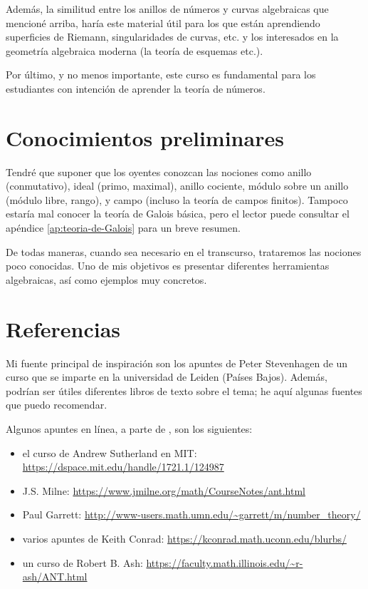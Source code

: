 Además, la similitud entre los anillos de números y curvas algebraicas que
mencioné arriba, haría este material útil para los que están aprendiendo
superficies de Riemann, singularidades de curvas, etc. y los interesados
en la geometría algebraica moderna (la teoría de esquemas etc.).

Por último, y no menos importante, este curso es fundamental para los
estudiantes con intención de aprender la teoría de números.

\section{Conocimientos preliminares}

Tendré que suponer que los oyentes conozcan las nociones como anillo
(conmutativo), ideal (primo, maximal), anillo cociente, módulo sobre un anillo
(módulo libre, rango), y campo (incluso la teoría de campos finitos).
Tampoco estaría mal conocer la teoría de Galois básica, pero el lector puede
consultar el apéndice \ref{ap:teoria-de-Galois} para un breve resumen.

De todas maneras, cuando sea necesario en el transcurso, trataremos las nociones
poco conocidas. Uno de mis objetivos es presentar diferentes herramientas
algebraicas, así como ejemplos muy concretos.

\section{Referencias}

Mi fuente principal de inspiración son los apuntes de
Peter Stevenhagen \cite{Stevenhagen-NR} de un curso que se imparte en
la universidad de Leiden (Países Bajos). Además, podrían ser útiles diferentes
libros de texto sobre el tema; he aquí algunas fuentes que puedo recomendar.

Algunos apuntes en línea, a parte de \cite{Stevenhagen-NR}, son los siguientes:
\begin{itemize}
\item el curso de Andrew Sutherland en MIT:
  \url{https://dspace.mit.edu/handle/1721.1/124987}

\item J.S. Milne: 
  \url{https://www.jmilne.org/math/CourseNotes/ant.html}

\item Paul Garrett:
  \url{http://www-users.math.umn.edu/~garrett/m/number_theory/}

\item varios apuntes de Keith Conrad:
  \url{https://kconrad.math.uconn.edu/blurbs/}

\item un curso de Robert B. Ash:
  \url{https://faculty.math.illinois.edu/~r-ash/ANT.html}
\end{itemize}

